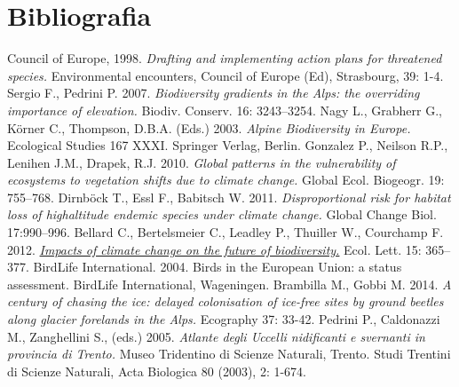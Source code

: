 \documentclass[10pt,twoside,openany,x11names,svgnames,italian,a5paper,dvipsnames,table]{memoir}
\newcommand\chapterillustration{}
\begin{document}
\setlength\afterchapskip{10mm}
\chapter{Bibliografia}
\renewcommand\chapterillustration{}
\renewcommand*{\bibname}{}
\begingroup
\renewcommand{\addcontentsline}[3]{}%
\renewcommand{\section}[2]{}%
\begin{thebibliography}{9}
\footnotesize
{} Council of Europe, 1998. \emph{Drafting and implementing action plans for threatened species.} Environmental encounters, Council of Europe (Ed), Strasbourg, 39: 1-4.
Sergio F., Pedrini P. 2007. \emph{Biodiversity gradients in the Alps: the overriding importance of elevation.} Biodiv. Conserv. 16: 3243–3254. 
Nagy L., Grabherr G., Körner C., Thompson, D.B.A. (Eds.) 2003. \emph{Alpine Biodiversity in Europe.} Ecological Studies 167 XXXI. Springer Verlag, Berlin.
Gonzalez P., Neilson R.P., Lenihen J.M., Drapek, R.J. 2010. \emph{Global patterns in the vulnerability of ecosystems to vegetation shifts due to climate change.} Global Ecol. Biogeogr. 19: 755–768.
Dirnböck T., Essl F., Babitsch W. 2011. \emph{Disproportional risk for habitat loss of highaltitude endemic species under climate change.} Global Change Biol. 17:990–996.
Bellard C., Bertelsmeier C., Leadley P., Thuiller W., Courchamp F. 2012. \href{http://ourchildrenstrust.org/sites/default/files/2012.01.18-Impacts\%20of\%20climate\%20change\%20on\%20the\%20future\%20of\%20biodiversity\%20(Ecology\%20Letters_Bellard\%20et\%20al.).pdf}{\emph{Impacts of climate change on the future of biodiversity.}} Ecol. Lett. 15: 365–377.
BirdLife International. 2004. Birds in the European Union: a status assessment. BirdLife International, Wageningen.
 Brambilla M., Gobbi M. 2014. \emph{A century of chasing the ice: delayed colonisation of ice-free sites by ground beetles along glacier forelands in the Alps.} Ecography 37: 33-42.
Pedrini P., Caldonazzi M., Zanghellini S., (eds.) 2005. \emph{Atlante degli Uccelli nidificanti e svernanti in provincia di Trento.} Museo Tridentino di Scienze Naturali, Trento. Studi Trentini di Scienze Naturali, Acta Biologica 80 (2003), 2: 1-674.

\end{thebibliography}
\end{document}
